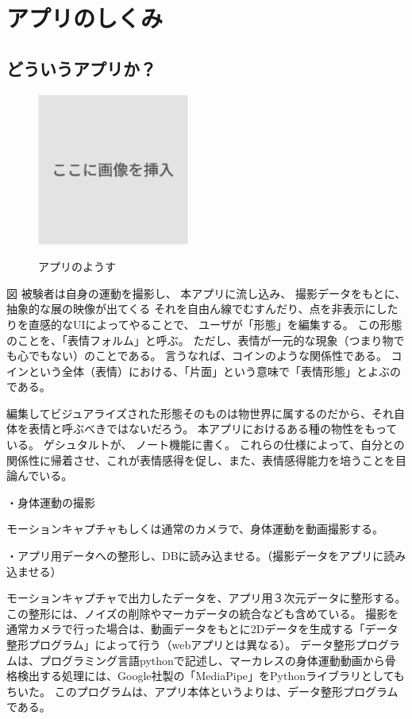 \chapter{アプリのしくみ}

\section{どういうアプリか？}
\begin{figure}[h]
  \centering
  \caption{アプリのようす}  
  \includegraphics[width=5cm]{images/dummy.png}
  \label{fig:アプリのようす}
\end{figure}
図
被験者は自身の運動を撮影し、
本アプリに流し込み、
撮影データをもとに、
抽象的な展の映像が出てくる
それを自由ん線でむすんだり、点を非表示にしたりを直感的なUIによってやることで、
ユーザが「形態」を編集する。
この形態のことを、「表情フォルム」と呼ぶ。
ただし、表情が一元的な現象（つまり物でも心でもない）のことである。
言うなれば、コインのような関係性である。
コインという全体（表情）における、「片面」という意味で「表情形態」とよぶのである。

編集してビジュアライズされた形態そのものは物世界に属するのだから、それ自体を表情と呼ぶべきではないだろう。
本アプリにおけるある種の物性をもっている。
ゲシュタルトが、
ノート機能に書く。
これらの仕様によって、自分との関係性に帰着させ、これが表情感得を促し、また、表情感得能力を培うことを目論んでいる。

・身体運動の撮影

モーションキャプチャもしくは通常のカメラで、身体運動を動画撮影する。



・アプリ用データへの整形し、DBに読み込ませる。（撮影データをアプリに読み込ませる）

モーションキャプチャで出力したデータを、アプリ用３次元データに整形する。この整形には、ノイズの削除やマーカデータの統合なども含めている。
撮影を通常カメラで行った場合は、動画データをもとに2Dデータを生成する「データ整形プログラム」によって行う（webアプリとは異なる）。
データ整形プログラムは、プログラミング言語pythonで記述し、マーカレスの身体運動動画から骨格検出する処理には、Google社製の「MediaPipe」\cite{mediapipe}をPythonライブラリとしてもちいた。
このプログラムは、アプリ本体というよりは、データ整形プログラムである。

